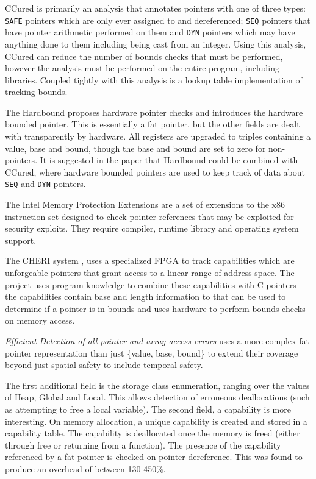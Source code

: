 CCured \cite{necula2002ccured} is primarily an analysis that annotates pointers with one of three types: \verb!SAFE! pointers which are only ever assigned to and dereferenced; \verb!SEQ! pointers that have pointer arithmetic performed on them and \verb!DYN! pointers which may have anything done to them including being cast from an integer.
Using this analysis, CCured can reduce the number of bounds checks that must be performed, however the analysis must be performed on the entire program, including libraries.
Coupled tightly with this analysis is a lookup table implementation of tracking bounds.

The Hardbound \cite{devietti2008hardbound} proposes hardware pointer checks and introduces the hardware bounded pointer. This is essentially a fat pointer, but the other fields are dealt with transparently by hardware.
All registers are upgraded to triples containing a value, base and bound, though the base and bound are set to zero for non-pointers.
It is suggested in the paper that Hardbound could be combined with CCured, where hardware bounded pointers are used to keep track of data about \verb!SEQ! and \verb!DYN! pointers.

The Intel Memory Protection Extensions \cite{mpx,intelMpxSpec} are a set of extensions to the x86 instruction set designed to check pointer references that may be exploited for security exploits.
They require compiler, runtime library and operating system support.

The CHERI system \cite{cheri}, uses a specialized FPGA to track capabilities which are unforgeable pointers that grant access to a linear range of address space.
The project uses program knowledge to combine these capabilities with C pointers - the capabilities contain base and length information to that can be used to determine if a pointer is in bounds and uses hardware to perform bounds checks on memory access.

\textit{Efficient Detection of all pointer and array access errors} \cite{austin1994efficient} uses a more complex fat pointer representation than just \{value, base, bound\} to extend their coverage beyond just spatial safety to include temporal safety.

The first additional field is the storage class enumeration, ranging over the values of Heap, Global and Local.
This allows detection of erroneous deallocations (such as attempting to free a local variable).
The second field, a capability is more interesting.
On memory allocation, a unique capability is created and stored in a capability table.
The capability is deallocated once the memory is freed (either through free or returning from a function).
The presence of the capability referenced by a fat pointer is checked on pointer dereference.
This was found to produce an overhead of between 130-450\%.

